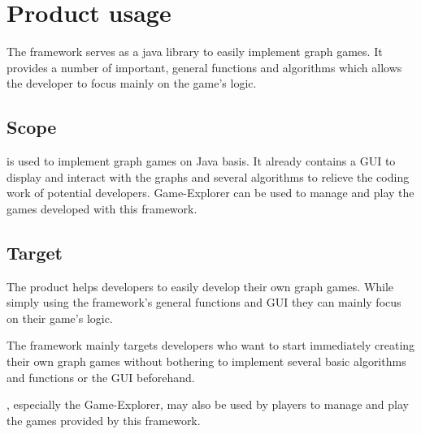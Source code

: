 \section{Product usage}
The \gls{framework} serves as a \Gls{java} \gls{library} to easily implement \gls{graph} \glspl{game}. It provides a number of important, general functions and \glspl{algorithm} which allows the \gls{developer} to focus mainly on the game's logic.

\subsection{Scope}
{\graphioli} is used to implement graph games on Java basis. It already contains a \gls{GUI} to display and interact with the graphs and several algorithms to relieve the coding work of potential developers. {\graphioli} Game-Explorer can be used to manage and play the games developed with this framework.

\subsection{Target}
The product helps developers to easily develop their own graph games. While simply using the framework's general functions and GUI they can mainly focus on their game's logic. \par
The framework mainly targets developers who want to start immediately creating their own graph games without bothering to implement several basic algorithms and functions or the GUI beforehand. \par
{\graphioli}, especially the Game-Explorer, may also be used by \glspl{player} to manage and play the games provided by this framework.